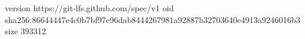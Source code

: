 version https://git-lfs.github.com/spec/v1
oid sha256:86644447e4c0b7bf97e96dab8444267981a92887b32703640e4913a9246016b3
size 393312
